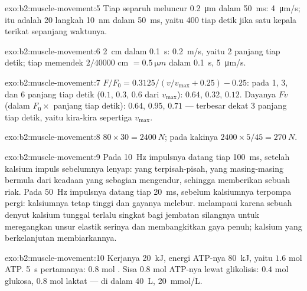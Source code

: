 \begin{solution}{exo:b2:muscle-movement:5}
Tiap separuh  meluncur \qty{0.2}{\micro m} dalam
\qty{50}{ms}: \qty{4}{\micro m/s}; itu adalah 20 langkah \qty{10}{nm}
dalam \qty{50}{ms}, yaitu 400 tiap detik jika satu kepala terikat
sepanjang waktunya.
\end{solution}

\begin{solution}{exo:b2:muscle-movement:6}
\qty{2}{cm} dalam \qty{0.1}{s}: \qty{0.2}{m/s}, yaitu 2 panjang tiap
detik; tiap  memendek $2/\num{40000}$ cm $= \qty{0.5}{\micro m}$ dalam
\qty{0.1}{s}, \qty{5}{\micro m/s}.
\end{solution}

\begin{solution}{exo:b2:muscle-movement:7}
$F/F_0 = 0.3125/(v/v_{\max} + 0.25) - 0.25$: pada 1, 3, dan 6 panjang
tiap detik ($0.1$, $0.3$, $0.6$ dari $v_{\max}$): $0.64$, $0.32$, $0.12$.
Dayanya $Fv$ (dalam $F_0\times$ panjang tiap detik): $0.64$, $0.95$, $0.71$
--- terbesar dekat 3 panjang tiap detik, yaitu kira-kira sepertiga $v_{\max}$.
\end{solution}

\begin{solution}{exo:b2:muscle-movement:8}
$80\times 30 = \qty{2400}{N}$; pada kakinya $2400\times 5/45 =
\qty{270}{N}$.
\end{solution}

\begin{solution}{exo:b2:muscle-movement:9}
Pada \qty{10}{Hz} impulsnya datang tiap \qty{100}{ms}, setelah kalsium
impuls sebelumnya lenyap:  yang terpisah-pisah, yang
masing-masing bermula dari keadaan yang sebagian mengendur, sehingga
memberikan sebuah riak. Pada \qty{50}{Hz} impulsnya datang tiap
\qty{20}{ms}, sebelum kalsiumnya terpompa pergi: kalsiumnya tetap
tinggi dan gayanya melebur.  melampaui  karena
sebuah denyut kalsium tunggal terlalu singkat bagi jembatan silangnya
untuk meregangkan unsur elastik serinya dan membangkitkan gaya penuh;
kalsium yang berkelanjutan membiarkannya.
\end{solution}

\begin{solution}{exo:b2:muscle-movement:10}
Kerjanya \qty{20}{kJ}, energi ATP-nya \qty{80}{kJ}, yaitu $1.6$ mol
ATP. \qty{5}{s} pertamanya: $0.8$ mol . Sisa $0.8$ mol
ATP-nya lewat glikolisis: $0.4$ mol glukosa, $0.8$ mol laktat --- di
dalam \qty{40}{L}, \qty{20}{mmol/L}.
\end{solution}

